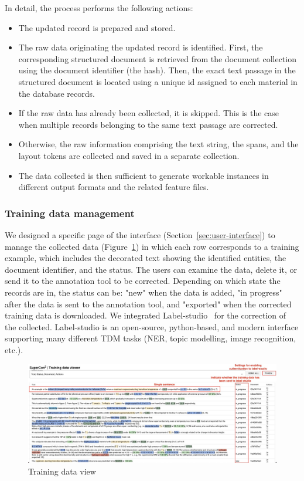 \documentclass[a4paper]{article}
\begin{document}
In detail, the process performs the following actions:
\begin{itemize}
    \item The updated record is prepared and stored.
    \item The raw data originating the updated record is identified. First, the corresponding structured document is retrieved from the document collection using the document identifier (the hash). Then, the exact text passage in the structured document is located using a unique id assigned to each material in the database records.
    \item If the raw data has already been collected, it is skipped. This is the case when multiple records belonging to the same text passage are corrected.
    \item Otherwise, the raw information comprising the text string, the spans, and the layout tokens are collected and saved in a separate collection.
    \item The data collected is then sufficient to generate workable instances in different output formats and the related feature files.
\end{itemize}

\subsubsection{Training data management}
We designed a specific page of the interface (Section~\ref{sec:user-interface}) to manage the collected data (Figure~\ref{fig:training-data-view}) in which each row corresponds to a training example, which includes the decorated text showing the identified entities, the document identifier, and the status. 
The users can examine the data, delete it, or send it to the annotation tool to be corrected. 
Depending on which state the records are in, the status can be: "new" when the data is added, "in progress" after the data is sent to the annotation tool, and "exported" when the corrected training data is downloaded. 
We integrated Label-studio~\cite{Label_Studio} for the correction of the collected. Label-studio is an open-source, python-based, and modern interface supporting many different TDM tasks (NER, topic modelling, image recognition, etc.). 

\begin{figure}[ht]
  \centering
  \includegraphics[width=1\textwidth]{images/training-data-viewer} 
  \caption{Training data view}
  \label{fig:training-data-view}
\end{figure}
\end{document}
